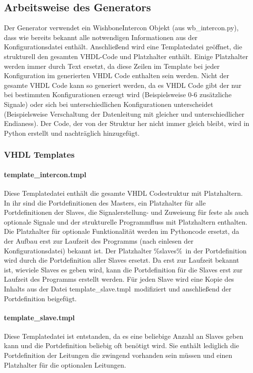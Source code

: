 \documentclass{article}
\newcommand{\nl}{\leavevmode\newline}
\begin{document}
\subsection{Arbeitsweise des Generators}
Der Generator verwendet ein WishboneIntercon Objekt (aus wb\_intercon.py), dass wie bereits bekannt alle notwendigen Informationen aus der Konfigurationsdatei enthält. Anschließend wird eine Templatedatei geöffnet, die strukturell den gesamten VHDL-Code und Platzhalter enthält. Einige Platzhalter werden immer durch Text ersetzt, da diese Zeilen im Template bei jeder Konfiguration im generierten VHDL Code enthalten sein werden. Nicht der gesamte VHDL Code kann so generiert werden, da es VHDL Code gibt der nur bei bestimmten Konfigurationen erzeugt wird (Beispielsweise 0-6 zusätzliche Signale) oder sich bei unterschiedlichen Konfigurationen unterscheidet (Beispielsweise Verschaltung der Datenleitung mit gleicher und unterschiedlicher Endianess). Der Code, der von der Struktur her nicht immer gleich bleibt, wird in Python erstellt und nachträglich hinzugefügt.
\subsubsection{VHDL Templates}
\paragraph{template\_intercon.tmpl}\nl
Diese Templatedatei enthält die gesamte VHDL Codestruktur mit Platzhaltern. In ihr sind die Portdefinitionen des Masters, ein Platzhalter für alle Portdefinitionen der Slaves, die Signalerstellung- und Zuweisung für feste als auch optionale Signale und der strukturelle Programmfluss mit Platzhaltern enthalten. Die Platzhalter für optionale Funktionalität werden im Pythoncode ersetzt, da der Aufbau erst zur Laufzeit des Programms (nach einlesen der Konfigurationsdatei) bekannt ist. Der Platzhalter \glqq \%slaves\%\grqq\ in der Portdefinition wird durch die Portdefinition aller Slaves ersetzt. Da erst zur Laufzeit bekannt ist, wieviele Slaves es geben wird, kann die Portdefinition für die Slaves erst zur Laufzeit des Programms erstellt werden. Für jeden Slave wird eine Kopie des Inhalts aus der Datei \glqq template\_slave.tmpl\grqq\ modifiziert und anschließend der Portdefinition beigefügt.
\paragraph{template\_slave.tmpl}\nl
Diese Templatedatei ist entstanden, da es eine beliebige Anzahl an Slaves geben kann und die Portdefinition beliebig oft benötigt wird. Sie enthält lediglich die Portdefinition der Leitungen die zwingend vorhanden sein müssen und einen Platzhalter für die optionalen Leitungen.
\end{document}
